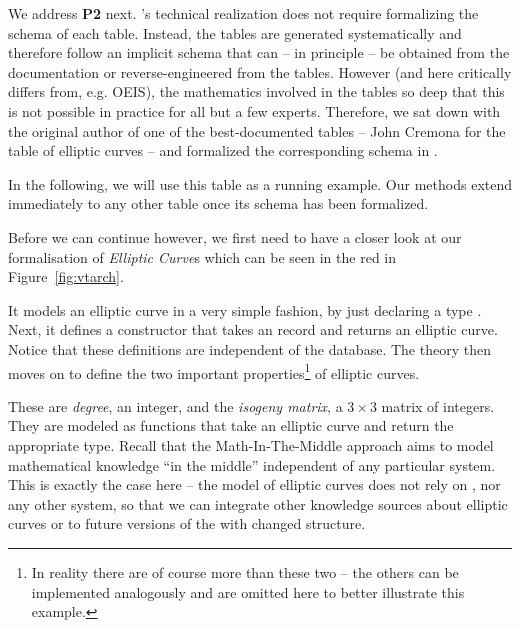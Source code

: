 We address \textbf{P2} next.
\lmfdb's technical realization does not require formalizing the schema of each table.
Instead, the tables are generated systematically and therefore follow an implicit schema that can -- in principle -- be obtained from the documentation or reverse-engineered from the tables.
However (and here \lmfdb critically differs from, e.g. OEIS), the mathematics involved in the tables so deep that this is not possible in practice for all but a few experts.
Therefore, we sat down with the original author of one of the best-documented tables -- John Cremona for the table of elliptic curves -- and formalized the corresponding schema in \ommt.

In the following, we will use this table as a running example.
Our methods extend immediately to any other table once its schema has been formalized.

Before we can continue however, we first need to have a closer look at our formalisation of \textit{Elliptic Curve}s which can be seen in the red in Figure~\ref{fig:vtarch}. 

It models an elliptic curve in a very simple fashion, by just declaring a type . 
Next, it defines a  constructor that takes an \mmt record and returns an elliptic curve. 
Notice that these definitions are independent of the \lmfdb database. 
The theory then moves on to define the two important properties\footnote{In reality there are of course more than these two -- the others can be implemented analogously and are omitted here to better illustrate this example.} of elliptic curves. 

These are \textit{degree}, an integer, and the \textit{isogeny matrix}, a $3 \times 3$ matrix of integers. 
They are modeled as functions that take an elliptic curve and return the appropriate type.  Recall that the Math-In-The-Middle approach aims to model mathematical
knowledge ``in the middle'' independent of any particular system. 
This is exactly the case here -- the model of elliptic curves does not rely on \lmfdb, nor any other system, so that we can integrate other knowledge sources about elliptic curves or to future versions of the \lmfdb with changed structure. 

